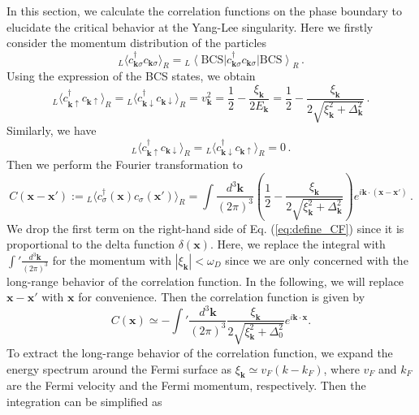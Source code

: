 \documentclass[aps,prl,twocolumn,superscriptaddress]{revtex4-1}
\begin{document}
\begin{bibunit}
In this section, we calculate the correlation functions on the phase boundary to elucidate the critical behavior at the Yang-Lee singularity. Here we firstly consider the momentum distribution of the particles
\begin{equation}
	{}_L\langle c_{\bm{k} \sigma}^{\dagger} c_{\bm{k} \sigma} \rangle_R = {}_L \left\langle
	\text{BCS} \right| c_{\bm{k} \sigma}^{\dagger} c_{\bm{k} \sigma} \left| \text{BCS}\right\rangle_R \,.
\end{equation}
Using the expression of the BCS states, we obtain
\begin{equation}
	{}_L\langle c_{\bm{k} \uparrow}^{\dagger} c_{\bm{k} \uparrow} \rangle_R = {}_L\langle c_{\bm{k}\downarrow}^{\dagger} c_{\bm{k} \downarrow} \rangle_R = v_{\bm{k}}^2 = \frac{1}{2} -
	\frac{\xi_{\bm{k}}}{2 E_{\bm{k}}} = \frac{1}{2} - \frac{\xi_{\bm{k}}}{2 \sqrt{\xi_{\bm{k}}^2 +
			\Delta_{\bm{k}}^2}}\,.
\end{equation}
Similarly, we have 
\begin{equation}
	{}_L\langle c_{\bm{k} \uparrow}^{\dagger} c_{\bm{k} \downarrow} \rangle_R = {}_L\langle c_{\bm{k}\downarrow}^{\dagger} c_{\bm{k} \uparrow} \rangle_R = 0\,.
\end{equation}
Then we perform the Fourier transformation to 
\begin{equation}
	C (\bm{x}-\bm{x}') := {}_L\langle c_{\sigma}^{\dagger} (\bm{x}) c_{\sigma} (\bm{x}') \rangle_R = \int \frac{d^3 \bm{k}}{(2 \pi)^3} \left(\frac{1}{2} - \frac{\xi_{\bm{k}}}{2 \sqrt{\xi_{\bm{k}}^2 + \Delta_{\bm{k}}^2}} \right)e^{i\bm{k} \cdot (\bm{x}-\bm{x}')}\,.
	\label{eq:define_CF}
\end{equation}
We drop the first term on the right-hand side of Eq. (\ref{eq:define_CF}) since it is proportional to the delta function $\delta(\bm{x})$. Here, we replace the integral with $\int ' \frac{d^3 \bm{k}}{(2 \pi)^3}$ for the momentum with $|\xi_{\bm{k}}|<\omega_D$ since we are only concerned with the long-range behavior of the correlation function. 
In the following, we will replace $\bm{x}-\bm{x}'$
with $\bm{x}$ for convenience. Then the correlation
function is given by
\begin{equation}
	C (\bm{x}) \simeq -\int ' \frac{d^3 \bm{k}}{(2 \pi)^3} \frac{\xi_{\bm{k}}}{2 \sqrt{\xi_{\bm{k}}^2
			+ \Delta_0^2}} e^{i\bm{k} \cdot \bm{x}}.
\end{equation}
To extract the long-range behavior of the correlation function, we expand the energy spectrum around the Fermi surface as $\xi_{\bm{k}} \simeq v_F (k - k_F)$, where $v_F$ and $k_F$ are the Fermi velocity and the Fermi momentum, respectively. Then the integration can be simplified as

\end{bibunit}
\end{document}
